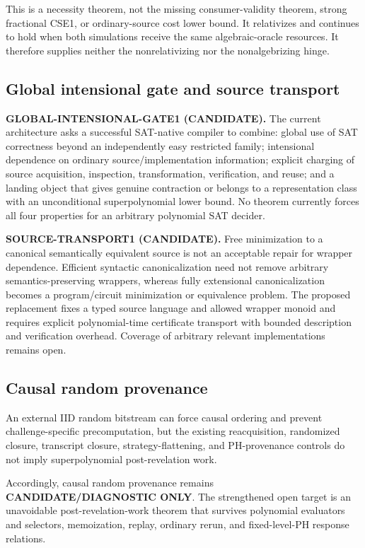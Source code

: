 \documentclass[11pt]{article}
\theoremstyle{plain}
\theoremstyle{definition}
\theoremstyle{remark}
\begin{document}
This is a necessity theorem, not the missing consumer-validity theorem,
strong fractional CSE1, or ordinary-source cost lower bound.  It relativizes
and continues to hold when both simulations receive the same algebraic-oracle
resources.  It therefore supplies neither the
nonrelativizing nor the nonalgebrizing hinge.

\subsection{Global intensional gate and source transport}

\textbf{GLOBAL-INTENSIONAL-GATE1 (CANDIDATE).}
The current architecture asks a successful SAT-native compiler to combine:
global use of SAT correctness beyond an independently easy restricted family;
intensional dependence on ordinary source/implementation information; explicit
charging of source acquisition, inspection, transformation, verification, and
reuse; and a landing object that gives genuine contraction or belongs to a
representation class with an unconditional superpolynomial lower bound.
No theorem currently forces all four properties for an arbitrary polynomial
SAT decider.

\textbf{SOURCE-TRANSPORT1 (CANDIDATE).}
Free minimization to a canonical semantically equivalent source is not an
acceptable repair for wrapper dependence.  Efficient syntactic
canonicalization need not remove arbitrary semantics-preserving wrappers,
whereas fully extensional canonicalization becomes a program/circuit
minimization or equivalence problem.  The proposed replacement fixes a typed
source language and allowed wrapper monoid and requires explicit
polynomial-time certificate transport with bounded description and
verification overhead.  Coverage of arbitrary relevant implementations
remains open.

\subsection{Causal random provenance}

An external IID random bitstream can force causal ordering and prevent
challenge-specific precomputation, but the existing reacquisition, randomized
closure, transcript closure, strategy-flattening, and PH-provenance controls
do not imply superpolynomial post-revelation work.

Accordingly, causal random provenance remains
\textbf{CANDIDATE/DIAGNOSTIC ONLY}.  The strengthened open target is an
unavoidable post-revelation-work theorem that survives polynomial evaluators
and selectors, memoization, replay, ordinary rerun, and fixed-level-PH
response relations.
\end{document}
